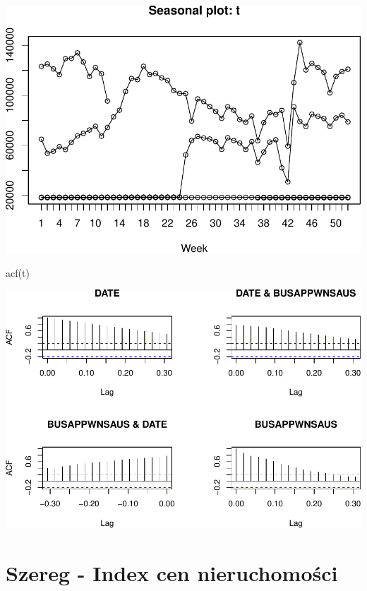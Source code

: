 \documentclass[
  polish,
]{article}
\newenvironment{Shaded}{\begin{snugshade}}{\end{snugshade}}
\newcommand{\FunctionTok}[1]{\textcolor[rgb]{0.00,0.00,0.00}{#1}}
\newcommand{\NormalTok}[1]{#1}
\begin{document}
\includegraphics{Analiza_files/figure-latex/unnamed-chunk-4-1.pdf}

\begin{Shaded}
\begin{Highlighting}[]
\FunctionTok{acf}\NormalTok{(t)}
\end{Highlighting}
\end{Shaded}

\includegraphics{Analiza_files/figure-latex/unnamed-chunk-5-1.pdf}

\hypertarget{szereg---index-cen-nieruchomoux15bci}{%
\section{Szereg - Index cen
nieruchomości}\label{szereg---index-cen-nieruchomoux15bci}}
\end{document}
